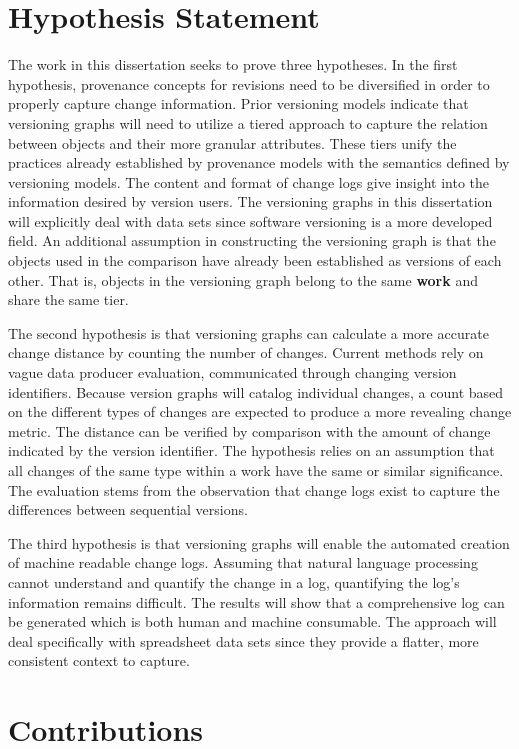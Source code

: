 \section{Hypothesis Statement}

The work in this dissertation seeks to prove three hypotheses.
In the first hypothesis, provenance concepts for revisions need to be diversified in order to properly capture change information.
Prior versioning models indicate that versioning graphs will need to utilize a tiered approach to capture the relation between objects and their more granular attributes.
These tiers unify the practices already established by provenance models with the semantics defined by versioning models.
The content and format of change logs give insight into the information desired by version users.
The versioning graphs in this dissertation will explicitly deal with data sets since software versioning is a more developed field.
An additional assumption in constructing the versioning graph is that the objects used in the comparison have already been established as versions of each other.
That is, objects in the versioning graph belong to the same \textbf{work} and share the same tier.

The second hypothesis is that versioning graphs can calculate a more accurate change distance by counting the number of changes.
Current methods rely on vague data producer evaluation, communicated through changing version identifiers.
Because version graphs will catalog individual changes, a count based on the different types of changes are expected to produce a more revealing change metric.
The distance can be verified by comparison with the amount of change indicated by the version identifier.
The hypothesis relies on an assumption that all changes of the same type within a work have the same or similar significance.
The evaluation stems from the observation that change logs exist to capture the differences between sequential versions.

The third hypothesis is that versioning graphs will enable the automated creation of machine readable change logs.
Assuming that natural language processing cannot understand and quantify the change in a log, quantifying the log's information remains difficult.
The results will show that a comprehensive log can be generated which is both human and machine consumable.
The approach will deal specifically with spreadsheet data sets since they provide a flatter, more consistent context to capture.

\section{Contributions}


